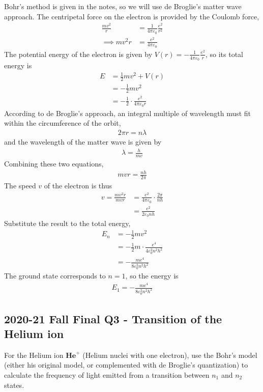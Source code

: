 \documentclass[12pt]{book} %
\numberwithin{equation}{chapter}
\def\e{\varepsilon}
\def\l{\lambda}
\begin{document}
\begin{solbox}
Bohr's method is given in the notes, so we will use de Broglie's matter wave approach.\bigskip\newline
The centripetal force on the electron is provided by the Coulomb force,
\begin{align*}
\frac{mv^{2}}{r}&=\frac{1}{4\pi\e_{0}}\frac{e^{2}}{r^{2}}\\
\implies mv^{2}r&=\frac{e^{2}}{4\pi\e_{0}}
\end{align*}
The potential energy of the electron is given by $V(r)=-\frac{1}{4\pi\e_{0}}\frac{e^{2}}{r}$, so its total energy is
\begin{align*}
E&=\frac{1}{2}mv^{2}+V(r)\\
&=-\frac{1}{2}mv^{2}\\
&=-\frac{1}{2}\cdot\frac{e^{2}}{4\pi\e_{0}r}
\end{align*}
According to de Broglie's approach, an integral multiple of wavelength must fit within the circumference of the orbit,
\begin{align*}
2\pi r=n\l
\end{align*}
and the wavelength of the matter wave is given by
\begin{align*}
\l=\frac{h}{mv}
\end{align*}
Combining these two equations,
\begin{align*}
mvr=\frac{nh}{2\pi}
\end{align*}
The speed $v$ of the electron is thus
\begin{align*}
v=\frac{mv^{2}r}{mvr}&=\frac{e^{2}}{4\pi\e_{0}}\cdot \frac{2\pi}{nh}\\
&=\frac{e^{2}}{2\e_{0}nh}
\end{align*}
Substitute the result to the total energy,
\begin{align*}
E_{n}&=-\frac{1}{2}mv^{2}\\
&=-\frac{1}{2}m\cdot \frac{e^{4}}{4\e_{0}^{2}n^{2}h^{2}}\\
&=-\frac{me^{4}}{8\e_{0}^{2}n^{2}h^{2}}
\end{align*}
The ground state corresponds to $n=1$, so the energy is
\begin{align*}
E_{1}=-\frac{me^{4}}{8\e_{0}^{2}n^{2}h^{2}}
\end{align*}
\end{solbox}

\subsection*{2020-21 Fall Final Q3 - Transition of the Helium ion}
For the Helium ion $\mathbf{He}^{+}$ (Helium nuclei with one electron), use the Bohr's model (either his original model, or complemented with de Broglie's quantization) to calculate the frequency of light emitted from a transition between $n_{1}$ and $n_{2}$ states.
\end{document}
